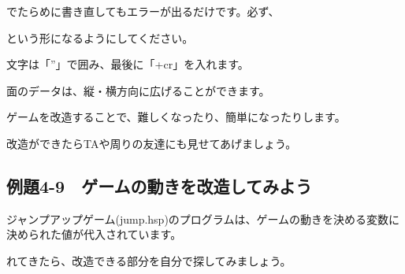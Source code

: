 \begin{description}
    \item {}
    \item {}
    \item {}
\end{description}

でたらめに書き直してもエラーが出るだけです。必ず、

\begin{description}
    \item {}
\end{description}

という形になるようにしてください。

文字は「”」で囲み、最後に「+cr」を入れます。

面のデータは、縦・横方向に広げることができます。


\begin{description}
    \item {}
\end{description}

ゲームを改造することで、難しくなったり、簡単になったりします。

改造ができたらTAや周りの友達にも見せてあげましょう。

\newpage
\subsection{例題4-9　ゲームの動きを改造してみよう}

\begin{description}
    \item {}
\end{description}



ジャンプアップゲーム(jump.hsp)のプログラムは、ゲームの動きを決める変数に決められた値が代入されています。

れてきたら、改造できる部分を自分で探してみましょう。




